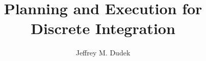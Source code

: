 \documentclass[12pt]{sty/ruthesis}
\title{Planning and Execution for Discrete Integration}
\author{Jeffrey M. Dudek}
\begin{document}
  \begin{frontmatter}
   \maketitle
   
   \tableofcontents
   \listoffigures
   \listoftables
  \end{frontmatter}

 









\appendix

%
%
%
%



\end{document}
